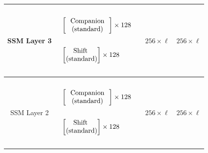 \begin{table}[]
\begin{tabular}{@{}c|c|c|c@{}}
SSM Layer 3 & \begin{math}\begin{aligned}    \begin{matrix}    \text{\phantom{-}} \\    \end{matrix}    \\    &    \begin{bmatrix}    \text{\phantom{-} Companion \phantom{-}}   \\ \text{(standard)} \\    \end{bmatrix}    \times 128     \\    \begin{matrix}    \text{\phantom{-}} \\    \end{matrix}    \\    &    \begin{bmatrix}    \text{\phantom{-} Shift \phantom{-} }   \\ \text{(standard)} \\    \end{bmatrix}     \times 128       \\     \begin{matrix}    \text{\phantom{-}} \\    \end{matrix}    \\\end{aligned}\end{math} & $256 \times \ell$ & $256 \times \ell$ \\ \midrule
SSM Layer 2 & \begin{math}\begin{aligned}    \begin{matrix}    \text{\phantom{-}} \\    \end{matrix}    \\    &    \begin{bmatrix}    \text{\phantom{-} Companion \phantom{-}}   \\ \text{(standard)} \\    \end{bmatrix}    \times 128     \\    \begin{matrix}    \text{\phantom{-}} \\    \end{matrix}    \\    &    \begin{bmatrix}    \text{\phantom{-} Shift \phantom{-} }   \\ \text{(standard)} \\    \end{bmatrix}     \times 128       \\     \begin{matrix}    \text{\phantom{-}} \\    \end{matrix}    \\\end{aligned}\end{math} & $256 \times \ell$ & $256 \times \ell$ \\ \midrule

\end{tabular}
\end{table}
